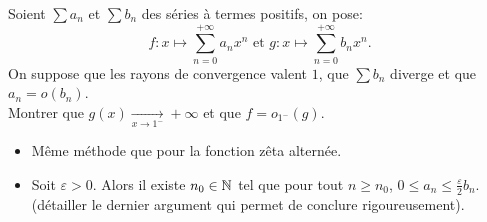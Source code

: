 \begin{exercice}    
    Soient $\sum a_n$ et $\sum b_n$ des séries à termes positifs, on pose:
    $$f:x \mapsto \sum_{n=0}^{+\infty} a_n x^n \text{ et } g:x \mapsto \sum_{n=0}^{+\infty} b_n x^n.$$
    On suppose que les rayons de convergence valent $1$, que $\sum b_n$ diverge et que $a_n = o(b_n)$.\\
    Montrer que $g(x) \xrightarrow[x \to 1^-]{} + \infty$ et que $f = o_{1^-}(g)$.
\end{exercice}

\begin{elem_sol}
    \begin{itemize}
        \item Même méthode que pour la fonction zêta alternée.
        \item Soit $\varepsilon > 0$. Alors il existe $n_0 \in \mathbb{N}$ tel que pour tout $n \geqslant n_0$, $0 \leqslant a_n \leqslant \frac{\varepsilon}{2} b_n$. (détailler le dernier argument qui permet de conclure rigoureusement).
    \end{itemize}
\end{elem_sol}
